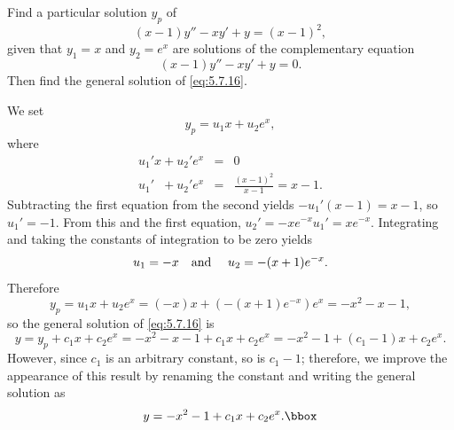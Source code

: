 \setcounter{example}{1}
\setcounter{equation}{15}
\begin{example}
  \label{example:5.7.2} \rm Find a particular solution $y_{p}$ of
  \begin{equation}
    \label{eq:5.7.16}(x-1)y''-xy'+y=(x-1)^{2},
  \end{equation}
  given that $y_{1}=x$ and $y_{2}=e^{x}$ are solutions of the complementary equation
  \[
    (x-1)y''-xy'+y=0.
  \]
  Then find the general solution of \eqref{eq:5.7.16}.
\end{example}
\setcounter{equation}{16}
\begin{examplesolution}
\solution We set
\[
  y_{p}=u_{1}x+u_{2}e^{x},
\]
where
\begin{eqnarray*}
  u_{1}'x+u_{2}'e^{x}           & = & 0 \\
  u_{1}'\phantom{x}+u_{2}'e^{x} & = & \frac{(x-1)^{2}}{x-1}=x-1.
\end{eqnarray*}
Subtracting the first equation from the second yields $-u_{1}'(x-1)=x-1$, so $u_{1}'=-1$. From this
and the first equation, $u_{2}'=-xe^{-x}u_{1}'=xe^{-x}$. Integrating and taking the constants of
integration to be zero yields
\[
  u_{1}=-x\mbox{\quad and \quad}u_{2}=-(x+1)e^{-x}.
\]
Therefore
\[
  y_{p}=u_{1}x+u_{2}e^{x}=(-x)x+(-(x+1)e^{-x})e^{x}=-x^{2}-x-1,
\]
so the general solution of \eqref{eq:5.7.16} is
\begin{equation}
  \label{eq:5.7.17}y=y_{p}+c_{1}x+c_{2}e^{x}=-x^{2}-x-1+c_{1}x+c_{2}e^{x}=-x^{2}-1+(c_{1}-1)x+c_{2}e^{x}.
\end{equation}
However, since $c_{1}$ is an arbitrary constant, so is $c_{1}-1$; therefore, we improve the
appearance of this result by renaming the constant and writing the general solution as
\begin{equation}
  \label{eq:5.7.18}y=-x^{2}-1+c_{1}x+c_{2}e^{x}.\bbox
\end{equation}
\end{examplesolution}


